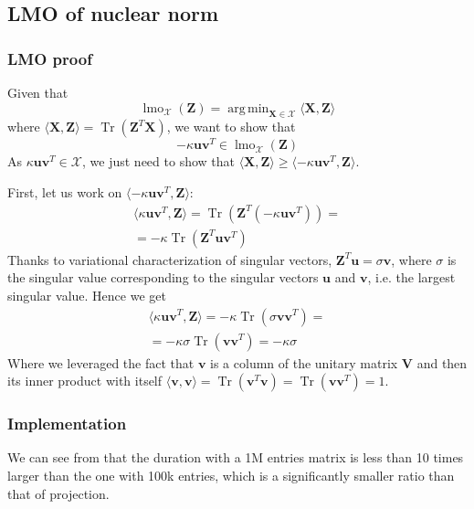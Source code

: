 \documentclass[12pt]{article}
\DeclareMathOperator*{\argmin}{arg\,min}
\DeclareMathOperator*{\lmo}{lmo}
\DeclareMathOperator*{\tr}{Tr}
\newcommand{\boldZ}{\mathbf{Z}}
\newcommand{\boldX}{\mathbf{X}}
\newcommand{\boldV}{\mathbf{V}}
\newcommand{\setX}{\mathcal{X}}
\newcommand{\boldu}{\mathbf{u}}
\newcommand{\boldv}{\mathbf{v}}
\begin{document}
\subsection{LMO of nuclear norm}
\subsubsection{LMO proof}
Given that
\begin{equation}
    \lmo_{\setX}(\boldZ) = \argmin_{\boldX \in \setX} \langle \boldX, \boldZ \rangle
\end{equation}
where $\langle \boldX, \boldZ \rangle = \tr(\boldZ^T\boldX)$, we want to show that
\begin{equation}
    -\kappa \boldu \boldv^T \in \lmo_{\setX}(\boldZ)
\end{equation}
As $\kappa \boldu \boldv^T \in \setX$, we just need to show that $\langle \boldX, \boldZ \rangle \geq \langle -\kappa \boldu \boldv^T, \boldZ \rangle$.

First, let us work on $\langle -\kappa \boldu \boldv^T, \boldZ \rangle$:
\begin{gather}
    \langle \kappa \boldu \boldv^T, \boldZ \rangle = \tr(\boldZ^T (-\kappa \boldu \boldv^T)) = \\
    = -\kappa \tr(\boldZ^T \boldu \boldv^T)
\end{gather}
Thanks to variational characterization of singular vectors, $\boldZ^T \boldu = \sigma \boldv$, where $\sigma$ is the singular value corresponding to the singular vectors $\boldu$ and $\boldv$, i.e. the largest singular value. Hence we get
\begin{gather}
    \langle \kappa \boldu \boldv^T, \boldZ \rangle = -\kappa \tr(\sigma \boldv \boldv^T) = \\
    = -\kappa \sigma \tr(\boldv \boldv^T) = -\kappa \sigma
\end{gather}
Where we leveraged the fact that $\boldv$ is a column of the unitary matrix $\boldV$ and then its inner product with itself $\langle \boldv, \boldv \rangle = \tr(\boldv^T\boldv) = \tr(\boldv\boldv^T) = 1$.

\subsubsection{Implementation}
We can see from  that the duration with a 1M entries matrix is less than 10 times larger than the one with 100k entries, which is a significantly smaller ratio than that of projection.
\end{document}
